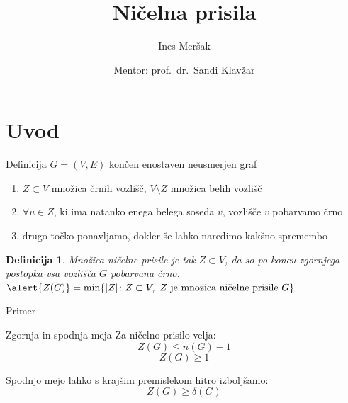 \documentclass{beamer}
\title[Ničelna prisila]{Ničelna prisila}
\author{Ines Meršak}
\date[25.9.2019]{Mentor: prof.~dr.~Sandi Klavžar}
\newtheorem{definicija}{Definicija}
\begin{document}
\frame{\titlepage}

\section{Uvod}
\begin{frame}[fragile,label=definicija]{Definicija}
    $ G = (V,E)$ končen enostaven neusmerjen graf

    \medskip
    
    \begin{enumerate}
        \item $Z \subset V$ množica črnih vozlišč, $V \setminus Z$ množica belih vozlišč
        \item $\forall u \in Z$, ki ima natanko enega belega soseda $v$, vozlišče $v$ pobarvamo črno
        \item drugo točko ponavljamo, dokler še lahko naredimo kakšno spremembo
    \end{enumerate}
    \begin{definicija}
        \alert{Množica ničelne prisile} je tak $Z \subset V$, da so po koncu zgornjega postopka vsa vozlišča $G$ pobarvana črno.
        $\alert{Z(G)} = \min \{|Z|\colon Z \subset V ,\ Z\text{ je množica ničelne prisile }G \} $
    \end{definicija}
\end{frame}

\begin{frame}{Primer}
    \begin{figure}
        \centering
    \end{figure}
\end{frame}


\begin{frame}{Zgornja in spodnja meja}
    Za ničelno prisilo velja: 
    \[ Z(G) \leq n(G) - 1 \]
    \[ Z(G)  \geq 1 \]
    
    Spodnjo mejo lahko s krajšim premislekom hitro izboljšamo:
    \[ Z(G) \geq \delta(G) \]
\end{frame}
\end{document}
